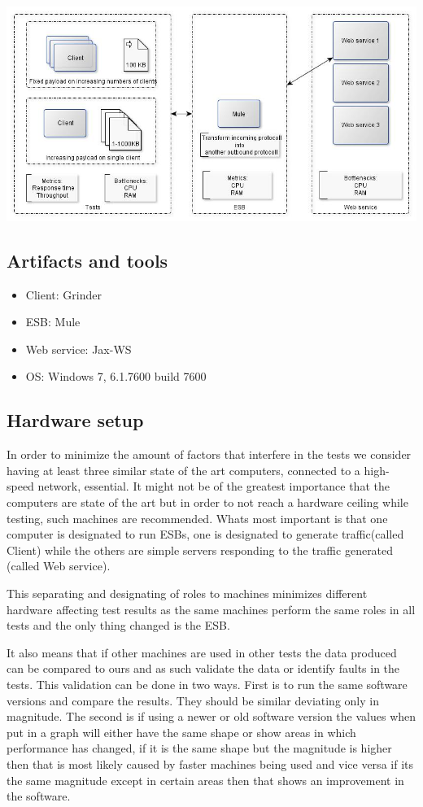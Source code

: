 \includegraphics[scale=0.5]{img/transformation}
\subsection{Artifacts and tools}
\begin{itemize}
	\item Client: Grinder \cite{whatisgrinder, kod}
	\item ESB: Mule \cite{whatismule, kod}
	\item Web service: Jax-WS \cite{whatisjaxws, kod}
	\item OS: Windows 7, 6.1.7600 build 7600
\end{itemize}

\subsection{Hardware setup}
 In order to minimize the amount of factors that interfere in the tests we consider having at least three similar state of the art computers, connected to a high-speed network, essential.
It might not be of the greatest importance that the computers are state of the art but in order to not reach a hardware ceiling while testing, such machines are recommended. Whats most important is that one computer is designated to run ESBs, one is designated to generate traffic(called Client) while the others are simple servers responding to the traffic generated (called Web service). 

This separating and designating of roles to machines minimizes different hardware affecting test results as the same machines perform the same roles in all tests and the only thing changed is the ESB. 

It also means that if other machines are used in other tests the data produced can be compared to ours and as such validate the data or identify faults in the tests. This validation can be done in two ways. First is to run the same software versions and compare the results. They should be similar deviating only in magnitude. The second is if using a newer or old software version the values when put in a graph will either have the same shape or show areas in which performance has changed, if it is the same shape but the magnitude is higher then that is most likely caused by faster machines being used and vice versa if its the same magnitude except in certain areas then that shows an improvement in the software.

